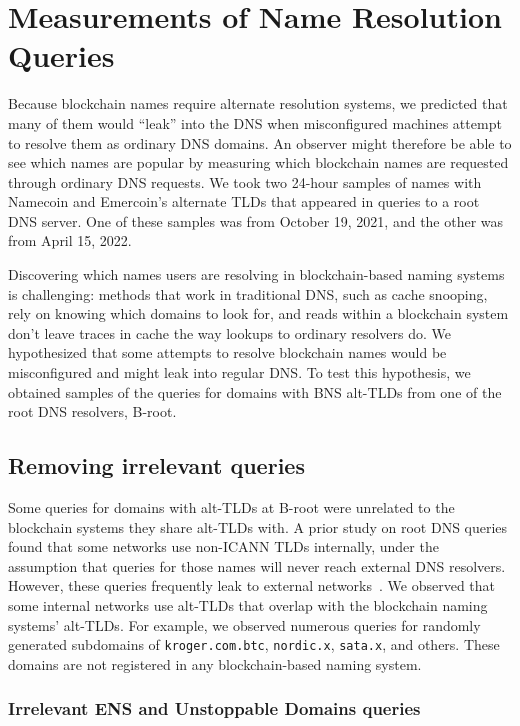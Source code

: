 \section{Measurements of Name Resolution Queries}
\label{sec:b-root}

Because blockchain names require alternate resolution systems, we predicted 
that many of them would ``leak'' into the DNS when misconfigured machines 
attempt to resolve them as ordinary DNS domains. An observer might therefore be 
able to see which names are popular by measuring which blockchain names are 
requested through ordinary DNS requests. We took two 24-hour samples of names 
with Namecoin and Emercoin's alternate TLDs that appeared in 
queries to a root DNS server. One of these samples was from October 19, 2021, 
and the other was from April 15, 2022.

Discovering which names users are resolving in blockchain-based 
naming systems is challenging: methods that work in traditional DNS, such as 
cache snooping, rely on knowing which domains to look for, and reads within a 
blockchain system don't leave traces in cache the way lookups to ordinary 
resolvers do. We hypothesized that some attempts to resolve blockchain names 
would be misconfigured and might leak into regular DNS. To test this 
hypothesis, we obtained samples of the queries for domains with BNS alt-TLDs 
from one of the root DNS resolvers, B-root.

\subsection{Removing irrelevant queries}

Some queries for domains with alt-TLDs at B-root were unrelated to the 
blockchain systems they share alt-TLDs with. A prior study on root DNS queries 
found that some networks use non-ICANN TLDs internally, under the assumption 
that queries for those names will never reach external DNS resolvers. However, 
these queries frequently leak to external networks~\cite{chen_wpad_2016}. We 
observed that some internal networks use alt-TLDs that overlap with the 
blockchain naming systems' alt-TLDs. For example, we observed numerous queries 
for randomly generated subdomains of 
\texttt{kroger.com.btc}, \texttt{nordic.x}, \texttt{sata.x}, and others. These 
domains are not registered in any blockchain-based naming system. 

\subsubsection{Irrelevant ENS and Unstoppable Domains queries}

